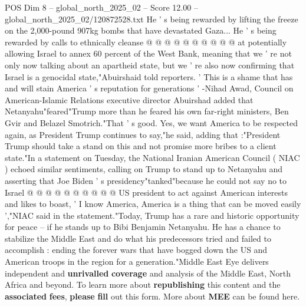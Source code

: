 \begin{textsample}{POS Dim 8 – global\_north\_2025\_02 – Score 12.00 – global\_north\_2025\_02/120872528.txt}
He ' s being rewarded by lifting the freeze on the 2,000-pound 907kg bombs that have devastated Gaza...
He ' s being rewarded by calls to ethnically cleanse @ @ @ @ @ @ @ @ @ @ at potentially allowing Israel to annex 60 percent of the West Bank, meaning that we ' re not only now talking about an apartheid state, but we ' re also now confirming that Israel is a genocidal state,"Abuirshaid told reporters. ' This is a shame that has and will stain America ' s reputation for generations ' -Nihad Awad, Council on American-Islamic Relations executive director Abuirshad added that Netanyahu"feared"Trump more than he feared his own far-right ministers, Ben Gvir and Belazel Smotrich."That ' s good.
Yes, we want America to be respected again, as President Trump continues to say,"he said, adding that :"President Trump should take a stand on this and not promise more bribes to a client state."In a statement on Tuesday, the National Iranian American Council ( NIAC ) echoed similar sentiments, calling on Trump to stand up to Netanyahu and asserting that Joe Biden ' s presidency"tanked"because he could not say no to Israel @ @ @ @ @ @ @ @ @ @ US president to act against American interests and likes to boast, ' I know America, America is a thing that can be moved easily ',"NIAC said in the statement."Today, Trump has a rare and historic opportunity for peace -- if he stands up to Bibi Benjamin Netanyahu.
He has a chance to stabilize the Middle East and do what his predecessors tried and failed to accomplish : ending the forever wars that have bogged down the US and American troops in the region for a generation."Middle East Eye delivers independent and \textbf{unrivalled} \textbf{coverage} and analysis of the Middle East, North Africa and beyond.
To learn more about \textbf{republishing} this content and the \textbf{associated} \textbf{fees}, \textbf{please} \textbf{fill} out this form.
More about \textbf{MEE} can be found here.

\end{textsample}
